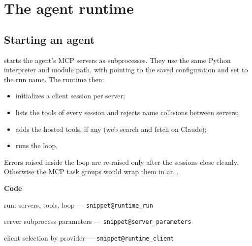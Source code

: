 \documentclass[11pt,a4paper]{article}
\makeatletter
\newcommand{\snippetsource}[1]{\csname snippet@#1\endcsname}
\newenvironment{codepointers}{%
  \par\smallskip\begingroup\footnotesize\noindent\textcolor{blue!50!black}{\textbf{Code}}\par\nopagebreak
  \begin{list}{}{\setlength{\leftmargin}{1.2em}\setlength{\itemsep}{0pt}\setlength{\parsep}{0pt}\setlength{\topsep}{1pt}}}%
  {\end{list}\endgroup\smallskip}
\newcommand{\codeitem}[2]{\item #2 --- \texttt{\snippetsource{#1}}}
\makeatother
\begin{document}


\section{The agent runtime}\label{sec:runtime}

\subsection{Starting an agent}
 starts the agent's MCP servers as subprocesses. They use the same
Python interpreter and module path, with  pointing to the saved
configuration and  set to the run name. The runtime then:
\begin{itemize}
  \item initializes a client session per server;
  \item lists the tools of every session and rejects name collisions between servers;
  \item adds the hosted tools, if any (web search and fetch on Claude);
  \item runs the loop.
\end{itemize}
Errors raised inside the loop are re-raised only after the sessions close cleanly.
Otherwise the MCP task groups would wrap them in an .
\begin{codepointers}
  \codeitem{runtime_run}{run: servers, tools, loop}
  \codeitem{server_parameters}{server subprocess parameters}
  \codeitem{runtime_client}{client selection by provider}
\end{codepointers}
\end{document}
